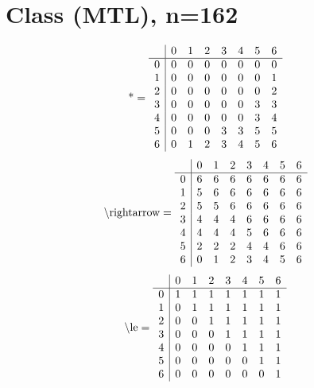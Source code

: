 \documentclass[11pt]{article}
\begin{document}
\section{Class (MTL), n=162}
\[\text{*} = 
\begin{array}{r | r r r r r r r}
 & 0 & 1 & 2 & 3 & 4 & 5 & 6 \\ \hline
0 & 0 & 0 & 0 & 0 & 0 & 0 & 0 \\
1 & 0 & 0 & 0 & 0 & 0 & 0 & 1 \\
2 & 0 & 0 & 0 & 0 & 0 & 0 & 2 \\
3 & 0 & 0 & 0 & 0 & 0 & 3 & 3 \\
4 & 0 & 0 & 0 & 0 & 0 & 3 & 4 \\
5 & 0 & 0 & 0 & 3 & 3 & 5 & 5 \\
6 & 0 & 1 & 2 & 3 & 4 & 5 & 6 \\
\end{array}
\]
\[\text{\textbackslash rightarrow} = 
\begin{array}{r | r r r r r r r}
 & 0 & 1 & 2 & 3 & 4 & 5 & 6 \\ \hline
0 & 6 & 6 & 6 & 6 & 6 & 6 & 6 \\
1 & 5 & 6 & 6 & 6 & 6 & 6 & 6 \\
2 & 5 & 5 & 6 & 6 & 6 & 6 & 6 \\
3 & 4 & 4 & 4 & 6 & 6 & 6 & 6 \\
4 & 4 & 4 & 4 & 5 & 6 & 6 & 6 \\
5 & 2 & 2 & 2 & 4 & 4 & 6 & 6 \\
6 & 0 & 1 & 2 & 3 & 4 & 5 & 6 \\
\end{array}
\]
\[\text{\textbackslash le} = 
\begin{array}{r | r r r r r r r}
 & 0 & 1 & 2 & 3 & 4 & 5 & 6 \\ \hline
0 & 1 & 1 & 1 & 1 & 1 & 1 & 1 \\
1 & 0 & 1 & 1 & 1 & 1 & 1 & 1 \\
2 & 0 & 0 & 1 & 1 & 1 & 1 & 1 \\
3 & 0 & 0 & 0 & 1 & 1 & 1 & 1 \\
4 & 0 & 0 & 0 & 0 & 1 & 1 & 1 \\
5 & 0 & 0 & 0 & 0 & 0 & 1 & 1 \\
6 & 0 & 0 & 0 & 0 & 0 & 0 & 1 \\
\end{array}
\]
\end{document}
